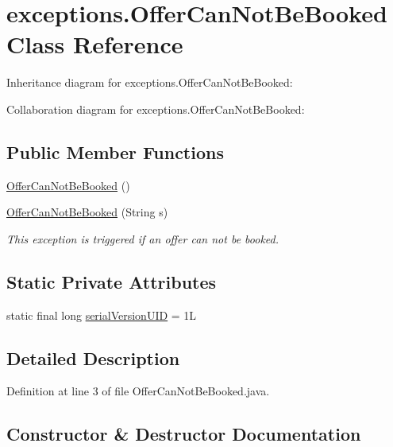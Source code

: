\hypertarget{classexceptions_1_1OfferCanNotBeBooked}{}\section{exceptions.\+Offer\+Can\+Not\+Be\+Booked Class Reference}
\label{classexceptions_1_1OfferCanNotBeBooked}


Inheritance diagram for exceptions.\+Offer\+Can\+Not\+Be\+Booked\+:


Collaboration diagram for exceptions.\+Offer\+Can\+Not\+Be\+Booked\+:
\subsection*{Public Member Functions}
\begin{DoxyCompactItemize}
\item 
\mbox{\hyperlink{classexceptions_1_1OfferCanNotBeBooked_a113511bf6eedf993448d483ff55cabb0}{Offer\+Can\+Not\+Be\+Booked}} ()
\item 
\mbox{\hyperlink{classexceptions_1_1OfferCanNotBeBooked_a08f25182868a230f2b49b37483560486}{Offer\+Can\+Not\+Be\+Booked}} (String s)
\begin{DoxyCompactList}\small\item\em This exception is triggered if an offer can not be booked. \end{DoxyCompactList}\end{DoxyCompactItemize}
\subsection*{Static Private Attributes}
\begin{DoxyCompactItemize}
\item 
static final long \mbox{\hyperlink{classexceptions_1_1OfferCanNotBeBooked_a0f0deac6a5fe9077f31bd1c90f1b0b59}{serial\+Version\+U\+ID}} = 1L
\end{DoxyCompactItemize}


\subsection{Detailed Description}


Definition at line 3 of file Offer\+Can\+Not\+Be\+Booked.\+java.



\subsection{Constructor \& Destructor Documentation}
\mbox{\label{classexceptions_1_1OfferCanNotBeBooked_a113511bf6eedf993448d483ff55cabb0}} 
